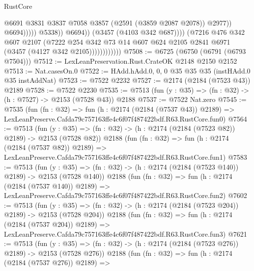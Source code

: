 \begin{lexlean}{RustCore}
\begin{coremodule}
                                              @6691
                                              @3831
                                              @3837
                                              @7058
                                              @3857
                                              (@2591 (@3859 @2087 @2078))
                                              @2977))
                                          @6694)))))
                                @5338))
                            @6694))
                        (@3457 (@4103 @342 @687))))
                    (@7216
                      @476
                      @342
                      @607
                      @2107
                      (@7222
                        @254
                        @342
                        @73
                        @14
                        @607
                        @624
                        @2105
                        @2841
                        @6971
                        (@3457 (@4127 @342 @2105))))))))))))
@7508 := @6725 (@6750 (@6791 (@6793 @7504)))
@7512 := LexLeanPreservation.Rust.CrateOK @2148 @2150 @2152
@7513 := Nat.casesOn.{0}
@7522 := HAdd.hAdd.{0, 0, 0} @35 @35 @35 (instHAdd.{0} @35 instAddNat)
@7523 := @7522 @2232
@7527 := @2174 (@2184 (@7523 @43)) @2189
@7528 := @7522 @2230
@7535 := @7513 (fun (y : @35) => (fn : @32) -> (h : @7527) -> @2153 (@7528 @43)) @2188
@7537 := @7522 Nat.zero
@7545 := @7535
    (fun (fn : @32) =>
    fun (h : @2174 (@2184 (@7537 @43)) @2189) =>
    LexLeanPreserve.Cafda79c757163ffe4c6f07f487422bdf.R63.RustCore.fun0)
@7564 := @7513
    (fun (y : @35) => (fn : @32) -> (h : @2174 (@2184 (@7523 @82)) @2189) -> @2153 (@7528 @82))
    @2188
    (fun (fn : @32) =>
    fun (h : @2174 (@2184 (@7537 @82)) @2189) =>
    LexLeanPreserve.Cafda79c757163ffe4c6f07f487422bdf.R63.RustCore.fun1)
@7583 := @7513
    (fun (y : @35) => (fn : @32) -> (h : @2174 (@2184 (@7523 @140)) @2189) -> @2153 (@7528 @140))
    @2188
    (fun (fn : @32) =>
    fun (h : @2174 (@2184 (@7537 @140)) @2189) =>
    LexLeanPreserve.Cafda79c757163ffe4c6f07f487422bdf.R63.RustCore.fun2)
@7602 := @7513
    (fun (y : @35) => (fn : @32) -> (h : @2174 (@2184 (@7523 @204)) @2189) -> @2153 (@7528 @204))
    @2188
    (fun (fn : @32) =>
    fun (h : @2174 (@2184 (@7537 @204)) @2189) =>
    LexLeanPreserve.Cafda79c757163ffe4c6f07f487422bdf.R63.RustCore.fun3)
@7621 := @7513
    (fun (y : @35) => (fn : @32) -> (h : @2174 (@2184 (@7523 @276)) @2189) -> @2153 (@7528 @276))
    @2188
    (fun (fn : @32) =>
    fun (h : @2174 (@2184 (@7537 @276)) @2189) =>

\end{coremodule}
\end{lexlean}
